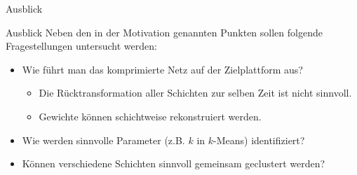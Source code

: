 \documentclass[aspectratio=169, 12pt]{beamer}
\begin{document}
\begin{frame}{Ausblick}
  \tableofcontents[currentsection]
\end{frame}

\begin{frame}{Ausblick}
  Neben den in der Motivation genannten Punkten sollen folgende Fragestellungen untersucht werden:
  \begin{itemize}
    \item Wie führt man das komprimierte Netz auf der Zielplattform aus?
          \begin{itemize}
            \item Die Rücktransformation aller Schichten zur selben Zeit ist nicht sinnvoll.
            \item Gewichte können schichtweise rekonstruiert werden.
          \end{itemize}
    \item Wie werden sinnvolle Parameter (z.B. $k$ in $k$-Means) identifiziert?
    \item Können verschiedene Schichten sinnvoll gemeinsam geclustert werden?
  \end{itemize}
\end{frame}

\end{document}
